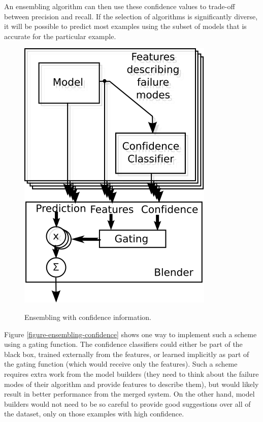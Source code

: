 \documentclass{article}
\begin{document}
An ensembling algorithm can then use these confidence values to trade-off between precision and recall.  If the selection of algorithms is significantly diverse, it will be possible to predict most examples using the subset of models that is accurate for the particular example.

\begin{figure}[t]
\vskip 0.2in
\caption{Ensembling with confidence information.}
\begin{center}
\centerline{\includegraphics{betterblender}}
\label{fig:ensembling-confidence}
\end{center}
\vskip -0.2in
\end{figure} 

Figure \ref{figure-ensembling-confidence} shows one way to implement such a scheme using a gating function.  The confidence classifiers could either be part of the black box, trained externally from the features, or learned implicitly as part of the gating function (which would receive only the features).  Such a scheme requires extra work from the model builders (they need to think about the failure modes of their algorithm and provide features to describe them), but would likely result in better performance from the merged system.  On the other hand, model builders would not need to be so careful to provide good suggestions over all of the dataset, only on those examples with high confidence.
\end{document}
